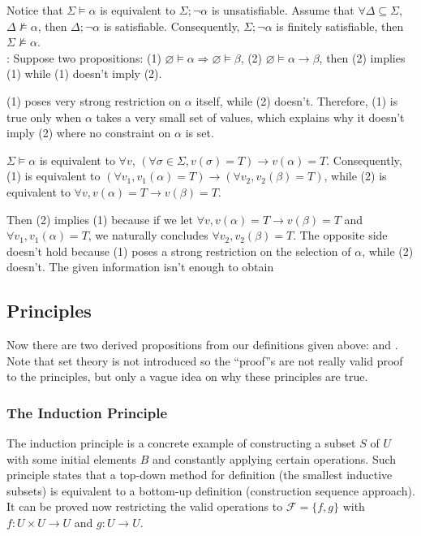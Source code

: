 \documentclass{article}
\begin{document}
\Proof
	Notice that $\Sigma \vDash \alpha$ is equivalent to $\Sigma; \neg\alpha$ is unsatisfiable. Assume that $\forall \Delta \subseteq \Sigma$, $\Delta \not\vDash \alpha$, then $\Delta; \neg\alpha$ is satisfiable. Consequently, $\Sigma; \neg\alpha$ is finitely satisfiable, then $\Sigma \not\vDash \alpha$.
\\

\noindent {}: Suppose two propositions: (1) $\varnothing \vDash \alpha \Longrightarrow \varnothing \vDash \beta$, (2) $\varnothing \vDash \alpha \to \beta$, then (2) implies (1) while (1) doesn't imply (2).

\Proof
	(1) poses very strong restriction on $\alpha$ itself, while (2) doesn't. Therefore, (1) is true only when $\alpha$ takes a very small set of values, which explains why it doesn't imply (2) where no constraint on $\alpha$ is set.
	
	$\Sigma \vDash \alpha$ is equivalent to $\forall v$, $\left( \forall \sigma \in \Sigma, v(\sigma)=T \right) \to v(\alpha)=T$. Consequently, (1) is equivalent to $\left( \forall v_1, v_1(\alpha)=T \right) \to \left( \forall v_2, v_2(\beta)=T \right)$, while (2) is equivalent to $\forall v, v(\alpha)=T \to v(\beta) = T$.
	
	Then (2) implies (1) because if we let $\forall v, v(\alpha)=T \to v(\beta) = T$ and $\forall v_1, v_1(\alpha)=T$, we naturally concludes $\forall v_2, v_2(\beta)=T$. The opposite side doesn't hold because (1) poses a strong restriction on the selection of $\alpha$, while (2) doesn't. The given information isn't enough to obtain 
	


\subsection{Principles}

Now there are two derived propositions from our definitions given above:  and . Note that set theory is not introduced so the ``proof''s are not really valid proof to the principles, but only a vague idea on why these principles are true.

\subsubsection{The Induction Principle}

The induction principle is a concrete example of constructing a subset $S$ of $U$ with some initial elements $B$ and constantly applying certain operations. Such principle states that a top-down method for definition (the smallest inductive subsets) is equivalent to a bottom-up definition (construction sequence approach). It can be proved now restricting the valid operations to $\mathcal{F}=\{f,g\}$ with $f:U\times U \to U$ and $g:U\to U$.
\end{document}
